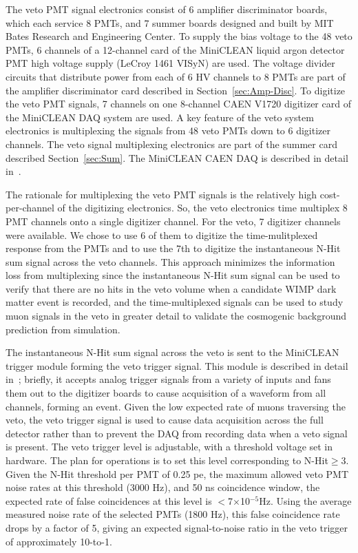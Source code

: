 \documentclass[review,number,sort&compress]{elsarticle}
\begin{document}
The veto PMT signal electronics consist of 6 amplifier discriminator
boards, which each service 8 PMTs, and 7 summer boards designed and
built by MIT Bates Research and Engineering Center.  To supply the
bias voltage to the 48 veto PMTs, 6 channels of a 12-channel card of
the MiniCLEAN liquid argon detector PMT high voltage supply (LeCroy
1461 VISyN) are used. The voltage divider circuits that distribute
power from each of 6 HV channels to 8 PMTs are part of the amplifier
discriminator card described in Section~\ref{sec:Amp-Disc}.  To
digitize the veto PMT signals, 7 channels on one 8-channel CAEN V1720
digitizer card of the MiniCLEAN DAQ system are used.  A key feature of
the veto system electronics is multiplexing the signals from 48 veto
PMTs down to 6 digitizer channels.  The veto signal multiplexing
electronics are part of the summer card described
Section~\ref{sec:Sum}. The MiniCLEAN CAEN DAQ is described in detail
in~\cite{ref:gastler_thesis}.

The rationale for multiplexing the veto PMT signals is the relatively
high cost-per-channel of the digitizing electronics.  So, the veto
electronics time multiplex 8 PMT channels onto a single digitizer
channel. For the veto, 7 digitizer channels were available. We chose
to use 6 of them to digitize the time-mulitplexed response from the
PMTs and to use the 7th to digitize the instantaneous N-Hit sum signal
across the veto channels.  This approach minimizes the information
loss from multiplexing since the instantaneous N-Hit sum signal can be
used to verify that there are no hits in the veto volume when a
candidate WIMP dark matter event is recorded, and the time-multiplexed
signals can be used to study muon signals in the veto in greater
detail to validate the cosmogenic background prediction from simulation.

The instantaneous N-Hit sum signal across the veto is sent to the
MiniCLEAN trigger module forming the veto trigger signal.  This module
is described in detail in~\cite{ref:gastler_thesis}; briefly, it
accepts analog trigger signals from a variety of inputs and fans them
out to the digitizer boards to cause acquisition of a waveform from
all channels, forming an event.  Given the low expected rate of muons
traversing the veto, the veto trigger signal is used to cause data
acquisition across the full detector rather than to prevent the DAQ
from recording data when a veto signal is present.  The veto trigger
level is adjustable, with a threshold voltage set in hardware.  The
plan for operations is to set this level corresponding to N-Hit$\ge$3.
Given the N-Hit threshold per PMT of 0.25 pe, the maximum allowed
veto PMT noise rates at this threshold (3000 Hz), and 50 ns
coincidence window, the expected rate of false coincidences at this
level is $<$7$\times$10$^{-5}$Hz.  Using the average measured noise
rate of the selected PMTs (1800 Hz), this false coincidence rate drops
by a factor of 5, giving an expected signal-to-noise ratio in the veto
trigger of approximately 10-to-1.
\end{document}
